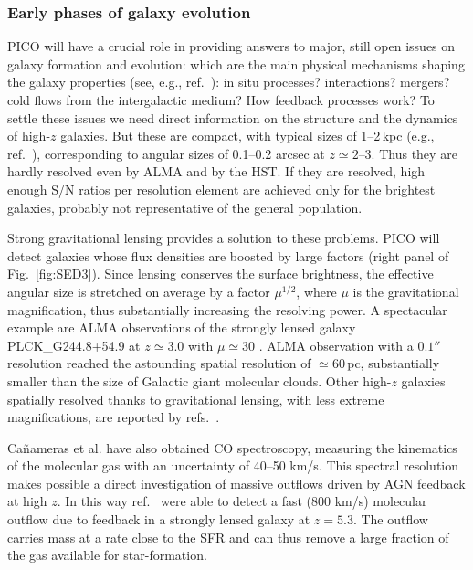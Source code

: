 \documentclass[PICOReport.tex]{subfiles}
\begin{document}
\subsubsection{Early phases of galaxy evolution}

PICO will have a crucial role in providing answers to major, still open issues on galaxy formation and evolution: which are the main physical mechanisms shaping the galaxy properties (see, e.g., ref.~\cite{SilkMamon2012, SomervilleDave2015}): in situ processes? interactions? mergers? cold flows  from the intergalactic medium? How feedback processes work? To settle these issues we need direct information on the structure and the dynamics of high-$z$ galaxies. But these are compact, with typical sizes of 1--2\,kpc (e.g., ref.~\cite{Fujimoto2018}), corresponding to angular sizes of 0.1--0.2 arcsec at $z\simeq 2$--3. Thus they are hardly resolved even by ALMA and by the HST. If they are resolved, high enough S/N ratios per resolution element are achieved only for the brightest galaxies, probably not representative of the general population.

Strong gravitational lensing provides a solution to these problems. PICO will detect galaxies whose flux densities are boosted by large factors (right panel of Fig.~\ref{fig:SED3}). Since lensing conserves the surface brightness, the effective angular size is stretched on average by a factor $\mu^{1/2}$, where $\mu$ is the gravitational magnification, thus substantially increasing the resolving power. A spectacular example are ALMA observations of the strongly lensed galaxy PLCK\_G244.8\-+54.9 at $z \simeq 3.0$  with $\mu \simeq 30$ \cite{Canameras2017ALMA}. ALMA observation with a $0.1''$ resolution reached the astounding spatial resolution of $\simeq 60\,$pc, substantially smaller than the size of Galactic giant molecular clouds. Other high-$z$ galaxies spatially resolved thanks to gravitational lensing, with less extreme magnifications, are reported by refs.~\cite{Dye2018, Lamarche2018, Sharda2018}.

Ca\~{n}ameras et al. \cite{Canameras2017ALMA} have also obtained CO spectroscopy, measuring the kinematics of the molecular gas with an uncertainty of 40--50 km/s. This spectral resolution makes possible a direct investigation of massive outflows driven by AGN feedback at high $z$. In this way ref.~\cite{Spilker2018} were able to detect a fast (800 km/s) molecular outflow due to feedback in a strongly lensed galaxy at $z=5.3$. The outflow carries mass at a rate close to the SFR and can thus remove a large fraction of the gas available for star-formation.
\end{document}
